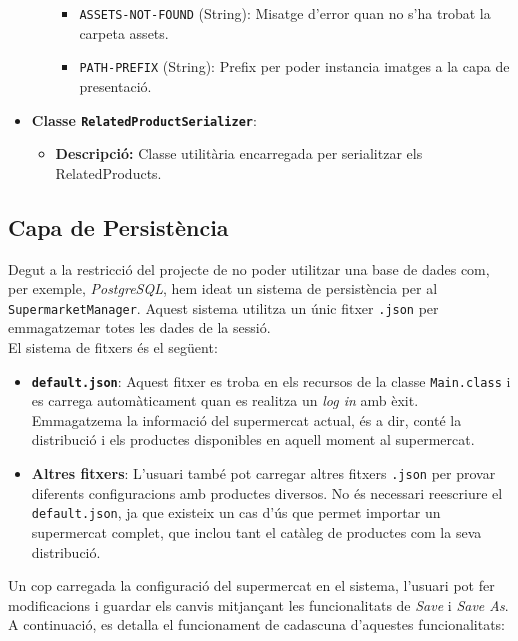 \documentclass[a4paper,12pt]{report}
\begin{document}
\begin{itemize}
\begin{itemize}
\begin{itemize}
				\item \texttt{ASSETS-NOT-FOUND} (String): Misatge d'error quan no s'ha trobat la carpeta assets.
				\item \texttt{PATH-PREFIX} (String): Prefix per poder instancia imatges a la capa de presentació.
			  \end{itemize}
			\end{itemize}
	\item \textbf{Classe \texttt{RelatedProductSerializer}}:
			\begin{itemize}
				\item \textbf{Descripció:} Classe utilitària encarregada per serialitzar els RelatedProducts.
			\end{itemize}
\end{itemize}

\subsection{Capa de Persistència}

Degut a la restricció del projecte de no poder utilitzar una base de dades com, per exemple, \textit{PostgreSQL}, hem ideat un sistema de persistència per al \texttt{SupermarketManager}. Aquest sistema utilitza un únic fitxer \texttt{.json} per emmagatzemar totes les dades de la sessió. \\

El sistema de fitxers és el següent:

\begin{itemize}
	\item \textbf{\texttt{default.json}}: Aquest fitxer es troba en els recursos de la classe \texttt{Main.class} i es carrega automàticament quan es realitza un \textit{log in} amb èxit. Emmagatzema la informació del supermercat actual, és a dir, conté la distribució i els productes disponibles en aquell moment al supermercat.
	
	\item \textbf{Altres fitxers}: L'usuari també pot carregar altres fitxers \texttt{.json} per provar diferents configuracions amb productes diversos. No és necessari reescriure el \texttt{default.json}, ja que existeix un cas d'ús que permet importar un supermercat complet, que inclou tant el catàleg de productes com la seva distribució.
\end{itemize}

Un cop carregada la configuració del supermercat en el sistema, l'usuari pot fer modificacions i guardar els canvis mitjançant les funcionalitats de \textit{Save} i \textit{Save As}. A continuació, es detalla el funcionament de cadascuna d'aquestes funcionalitats:
\end{document}
